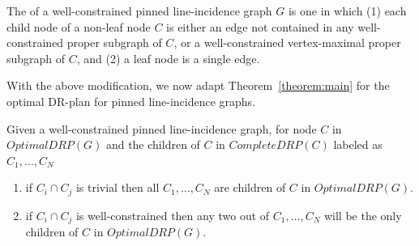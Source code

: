 
\begin{definition}
The  of a well-constrained pinned line-incidence graph $G$ is one in which
(1) each child node of a non-leaf node $C$ is either an edge not contained in any well-constrained proper subgraph of $C$, or a  well-constrained vertex-maximal proper subgraph of $C$, and
(2) a leaf node is a single edge.
\end{definition}


With the above modification, we now adapt Theorem~\ref{theorem:main}
for the optimal DR-plan for pinned line-incidence graphs.


\begin{corollary}\label{cor:pinned}
Given a well-constrained pinned line-incidence graph, for node $C$ in $OptimalDRP(G)$ and the children of $C$ in $CompleteDRP(C)$ labeled as $C_1,\ldots,C_N$
\begin{enumerate}
    \item if $C_i \cap C_j$ is trivial then all $C_1,\ldots,C_N$ are children of $C$ in $OptimalDRP(G)$.
    \item if $C_i \cap C_j$ is well-constrained then any two out of $C_1,\ldots,C_N$ will be the only children of $C$ in $OptimalDRP(G)$.
\end{enumerate}
\end{corollary}


